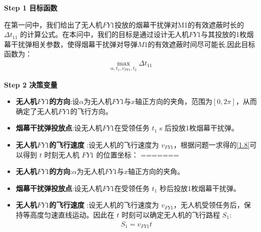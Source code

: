\documentclass[../main.tex]{subfiles}
\begin{document}
\noindent \textbf{Step 1 目标函数}
\par 在第一问中，我们给出了无人机$FY1$投放的烟幕干扰弹对M1的有效遮蔽时长的$\Delta t_{11}$ 的计算公式。在本问中，我们的目标是通过设计无人机$FY1$与其投放的1枚烟幕干扰弹相关参数，使得烟幕干扰弹对导弹$M1$的有效遮蔽时间尽可能长,因此目标函数为：
\begin{align}\label{10.1}
  \underset{\alpha ,t_1,v_{FY1},t_2}{\max}\Delta t_{11}
\end{align}



\noindent \textbf{Step 2 决策变量}

\begin{itemize}
<<<<<<< HEAD
\item \textbf{无人机$FY1$的方向}:设$\alpha $为无人机$FY1$与$x$轴正方向的夹角，范围为$\left[ 0,2\pi \right] $，从而确定了无人机$FY1$的飞行方向。
\item \textbf{烟幕干扰弹投放点}:设无人机$FY1$在受领任务 \( t_1 \) s 后投放1枚烟幕干扰弹。
\item  \textbf{无人机$FY1$的飞行速度} :设无人机的飞行速度为 \( v_{FY1} \)，根据问题一求得的\eqref{1.8}可以得到 \( t \) 时刻无人机 \( FY1 \) 的位置坐标：
=======
\item \textbf{无人机$FY1$的方向}:$\alpha $为无人机$FY1$与$x$轴正方向的夹角。
\item \textbf{烟幕干扰弹投放点}:设无人机$FY1$在受领任务 \( t_1 \) 秒后投放1枚烟幕干扰弹。
\item  \textbf{无人机$FY1$的飞行速度} :设无人机的飞行速度为 \( v_{FY1} \)，无人机受领任务后，保持等高度匀速直线运动。因此在 \( t \) 时刻可以确定无人机的飞行路程 \( S_1 \):
\begin{align}\label{10.2}
S_1 = v_{FY1} t
\end{align}


\end{itemize}
\end{document}

